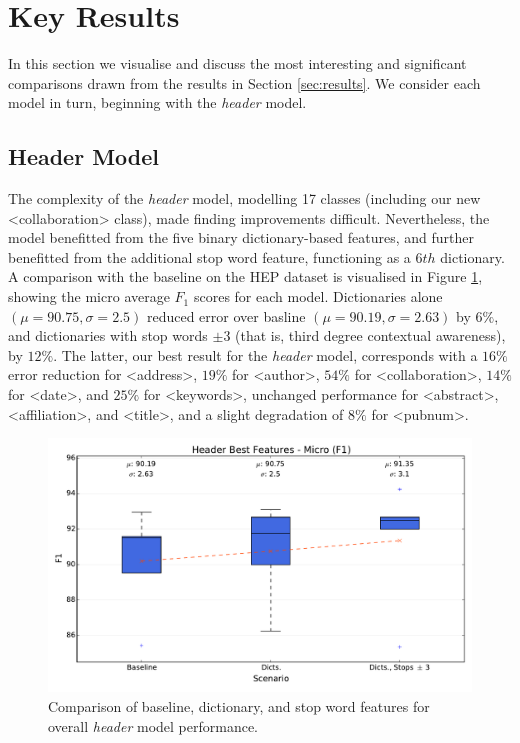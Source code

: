 \section{Key Results}
\label{sec:keyresults}

In this section we visualise and discuss the most interesting and significant comparisons drawn from the results in Section \ref{sec:results}. We consider each model in turn, beginning with the \emph{header} model.

\subsection{Header Model}

The complexity of the \emph{header} model, modelling 17 classes (including our new <collaboration> class), made finding improvements difficult. Nevertheless, the model benefitted from the five binary dictionary-based features, and further benefitted from the additional stop word feature, functioning as a $6th$ dictionary. A comparison with the baseline on the HEP dataset is visualised in Figure \ref{fig:micro_header}, showing the micro average $F_1$ scores for each model. Dictionaries alone $(\mu = 90.75, \sigma = 2.5)$ reduced error over basline $(\mu = 90.19, \sigma = 2.63)$ by $6\%$, and dictionaries with stop words $\pm 3$ (that is, third degree contextual awareness), by $12\%$. The latter, our best result for the \emph{header} model, corresponds with a $16\%$ error reduction for <address>, $19\%$ for <author>, $54\%$ for <collaboration>, $14\%$ for <date>, and $25\%$ for <keywords>, unchanged performance for <abstract>, <affiliation>, and <title>, and a slight degradation of $8\%$ for <pubnum>.

\begin{figure}[h]
\center
\includegraphics[width=5.5in]{Figures/micro_header.pdf}
\caption{Comparison of baseline, dictionary, and stop word features for overall \emph{header} model performance.}
\label{fig:micro_header}
\end{figure}

